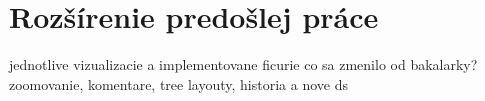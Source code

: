 \section{Rozšírenie predošlej práce}
jednotlive vizualizacie a implementovane ficurie
co sa zmenilo od bakalarky? zoomovanie, komentare, tree layouty, historia a nove ds